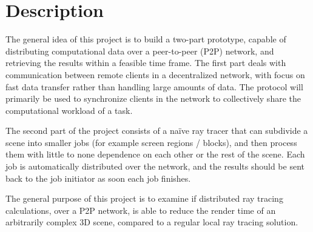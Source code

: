 \chapter{Description}


The general idea of this project is to build a two-part prototype, capable of distributing computational data over a peer-to-peer (P2P) network, and retrieving the results within a feasible time frame. The first part deals with communication between remote clients in a decentralized network, with focus on fast data transfer rather than handling large amounts of data. The protocol will primarily be used to synchronize clients in the network to collectively share the computational workload of a task. 

The second part of the project consists of a naïve ray tracer that can subdivide a scene into smaller jobs (for example screen regions / blocks), and then process them with little to none dependence on each other or the rest of the scene. Each job is automatically distributed over the network, and the results should be sent back to the job initiator as soon each job finishes.

The general purpose of this project is to examine if distributed ray tracing calculations, over a P2P network, is able to reduce the render time of an arbitrarily complex 3D scene, compared to a regular local ray tracing solution. 

 